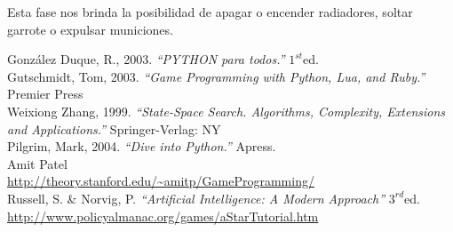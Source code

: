 \documentclass[a4paper,12pt,oneside]{book}
\begin{document}
Esta fase nos brinda la posibilidad de apagar o encender radiadores,
soltar garrote o expulsar municiones.

\newpage
\begin{thebibliography}{XXX}
 González Duque, R., 2003. {\it ``PYTHON para todos.''} $1^{st}$ed. \\
 Gutschmidt, Tom, 2003. {\it ``Game Programming with Python,
    Lua, and Ruby.''  } Premier Press \\
 Weixiong Zhang, 1999. {\it ``State-Space Search. Algorithms,
  Complexity, Extensions and Applications.''} Springer-Verlag: NY \\
 Pilgrim, Mark, 2004. {\it ``Dive into Python.''} Apress. \\
 Amit Patel\\ \url{
    http://theory.stanford.edu/~amitp/GameProgramming/} \label{amit}
  \\
 Russell, S. \& Norvig, P. {\it ``Artificial Intelligence: A
    Modern Approach''} $3^{rd}$ed. \\ \label{russell}
  \url{http://www.policyalmanac.org/games/aStarTutorial.htm}\\
  \url{ }\\
  \url{ }\\
  \url{ }
\end{thebibliography}
\end{document}
